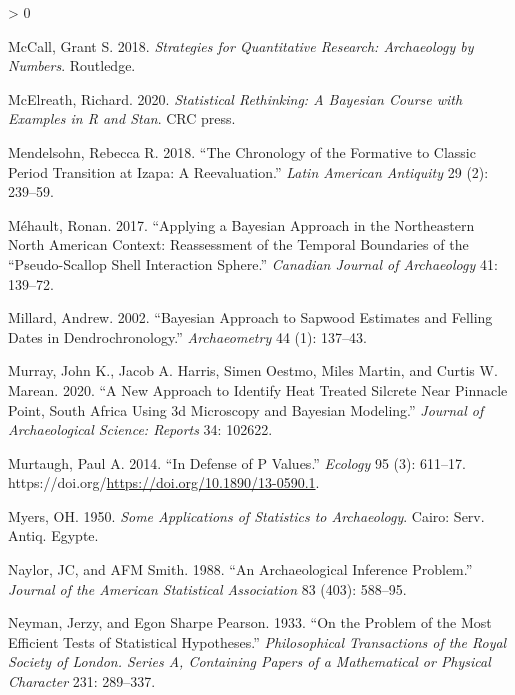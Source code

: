 \documentclass[
]{article}
\newlength{\cslhangindent}
\newenvironment{CSLReferences}[2] %
 {%
  \setlength{\parindent}{0pt}
  \ifodd #1 \everypar{\setlength{\hangindent}{\cslhangindent}}\ignorespaces\fi
  \ifnum #2 > 0
  \setlength{\parskip}{#2\baselineskip}
  \fi
 }%
 {}
\begin{document}
\begin{CSLReferences}{1}{0}
\leavevmode\hypertarget{ref-mccall_strategies_2018}{}%
McCall, Grant S. 2018. \emph{Strategies for Quantitative Research:
{Archaeology} by Numbers}. Routledge.

\leavevmode\hypertarget{ref-mcelreath_statistical_2020}{}%
McElreath, Richard. 2020. \emph{Statistical Rethinking: {A} {Bayesian}
Course with Examples in {R} and {Stan}}. CRC press.

\leavevmode\hypertarget{ref-mendelsohn_chronology_2018}{}%
Mendelsohn, Rebecca R. 2018. {``The Chronology of the {Formative} to
{Classic} Period Transition at {Izapa}: A Reevaluation.''} \emph{Latin
American Antiquity} 29 (2): 239--59.

\leavevmode\hypertarget{ref-mehault_applying_2017}{}%
Méhault, Ronan. 2017. {``Applying a {Bayesian} {Approach} in the
{Northeastern} {North} {American} {Context}: {Reassessment} of the
{Temporal} {Boundaries} of the ``{Pseudo}-{Scallop} {Shell}
{Interaction} {Sphere}.''} \emph{Canadian Journal of Archaeology} 41:
139--72.

\leavevmode\hypertarget{ref-millard_bayesian_2002}{}%
Millard, Andrew. 2002. {``Bayesian Approach to Sapwood Estimates and
Felling Dates in Dendrochronology.''} \emph{Archaeometry} 44 (1):
137--43.

\leavevmode\hypertarget{ref-murray_new_2020}{}%
Murray, John K., Jacob A. Harris, Simen Oestmo, Miles Martin, and Curtis
W. Marean. 2020. {``A New Approach to Identify Heat Treated Silcrete
Near {Pinnacle} {Point}, {South} {Africa} Using {3d} Microscopy and
{Bayesian} Modeling.''} \emph{Journal of Archaeological Science:
Reports} 34: 102622.

\leavevmode\hypertarget{ref-murtaugh_defense_2014}{}%
Murtaugh, Paul A. 2014. {``In Defense of {P} Values.''} \emph{Ecology}
95 (3): 611--17.
https://doi.org/\url{https://doi.org/10.1890/13-0590.1}.

\leavevmode\hypertarget{ref-myers_applications_1950}{}%
Myers, OH. 1950. \emph{Some {Applications} of {Statistics} to
{Archaeology}}. Cairo: Serv. Antiq. Egypte.

\leavevmode\hypertarget{ref-naylor_archaeological_1988}{}%
Naylor, JC, and AFM Smith. 1988. {``An Archaeological Inference
Problem.''} \emph{Journal of the American Statistical Association} 83
(403): 588--95.

\leavevmode\hypertarget{ref-neyman_problem_1933}{}%
Neyman, Jerzy, and Egon Sharpe Pearson. 1933. {``On the Problem of the
Most Efficient Tests of Statistical Hypotheses.''} \emph{Philosophical
Transactions of the Royal Society of London. Series A, Containing Papers
of a Mathematical or Physical Character} 231: 289--337.


\end{CSLReferences}
\end{document}
